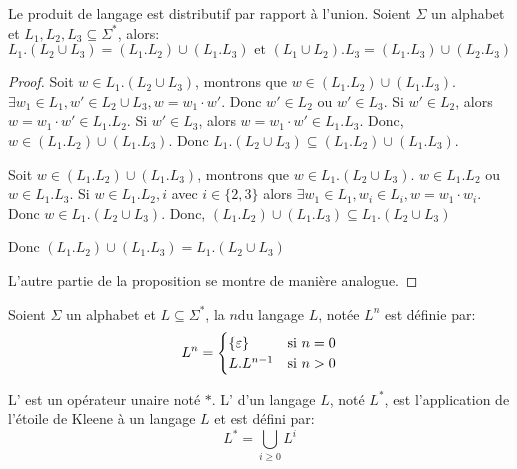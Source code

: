 \begin{proposition}
	Le produit de langage est distributif par rapport à l'union. Soient \( \Sigma \) un alphabet et \( L_1, L_2, L_3 \subseteq \Sigma^* \), alors:
	\begin{equation}
		L_1 . (L_2 \cup L_3) = (L_1 . L_2) \cup (L_1 . L_3) \text{ et } (L_1 \cup L_2) . L_3 = (L_1 . L_3) \cup (L_2 . L_3)
	\end{equation}
\end{proposition}

\begin{proof}
	Soit \( w \in L_1 . (L_2 \cup L_3)\), montrons que \( w \in (L_1 . L_2) \cup (L_1 . L_3)\).
	\( \exists w_1 \in L_1, w' \in L_2 \cup L_3, w = w_1 \cdot w'\). Donc \( w' \in L_2\) ou \( w' \in L_3\).
	Si \( w' \in L_2\), alors \( w = w_1 \cdot w' \in L_1 . L_2\).
	Si \( w' \in L_3\), alors \( w = w_1 \cdot w' \in L_1 . L_3\).
	Donc, \( w \in (L_1 . L_2) \cup (L_1 . L_3)\).
	Donc \( L_1 . (L_2 \cup L_3) \subseteq (L_1 . L_2) \cup (L_1 . L_3)\).

	Soit \( w \in (L_1 . L_2) \cup (L_1 . L_3)\), montrons que \( w \in L_1 . (L_2 \cup L_3)\).
	\( w \in L_1 . L_2\) ou \( w \in L_1 . L_3\).
	Si \( w \in L_1 . L_2, i\) avec \(  i \in \{ 2, 3\}\) alors \( \exists w_1 \in L_1, w_i \in L_i, w = w_1 \cdot w_i\).
	Donc \( w \in L_1 . (L_2 \cup L_3)\).
	Donc, \( (L_1 . L_2) \cup (L_1 . L_3) \subseteq L_1 . (L_2 \cup L_3)\)

	Donc \( (L_1 . L_2) \cup (L_1 . L_3) = L_1 . (L_2 \cup L_3)\)

	L'autre partie de la proposition se montre de manière analogue.
\end{proof}


\begin{definition}
	Soient \( \Sigma \) un alphabet et \( L \subseteq \Sigma^* \), la  \( n \)\ieme du langage \( L \), notée \( L^n \) est définie par:
	\[
		L^n =
		\begin{cases}
			\{ \varepsilon \} & \text{si \( n = 0\)} \\
			L . L^{n-1}       & \text{si \( n > 0\)}
		\end{cases}
	\]
\end{definition}


\begin{definition}
	L' est un opérateur unaire noté \( * \). L' d'un langage \( L \), noté \( L^* \), est l'application de l'étoile de Kleene à un langage \( L \) et est défini par:
	\begin{equation}
		L^* = \bigcup_{i \geq 0} L^i
	\end{equation}
\end{definition}

